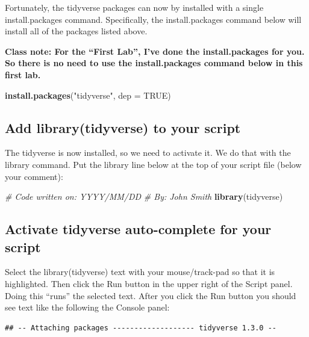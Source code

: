 \documentclass[
]{krantz}
\makeatletter
\newenvironment{Shaded}{\begin{snugshade}}{\end{snugshade}}
\newcommand{\CommentTok}[1]{\textcolor[rgb]{0.37,0.37,0.37}{\textit{#1}}}
\newcommand{\DataTypeTok}[1]{\textcolor[rgb]{0.27,0.27,0.27}{#1}}
\newcommand{\KeywordTok}[1]{\textcolor[rgb]{0.27,0.27,0.27}{\textbf{#1}}}
\newcommand{\NormalTok}[1]{#1}
\newcommand{\OtherTok}[1]{\textcolor[rgb]{0.37,0.37,0.37}{#1}}
\newcommand{\StringTok}[1]{\textcolor[rgb]{0.5,0.5,0.5}{#1}}
\newenvironment{kframe}{%
\medskip{}
\setlength{\fboxsep}{.8em}
 \def\at@end@of@kframe{}%
 \ifinner\ifhmode%
  \def\at@end@of@kframe{\end{minipage}}%
  \begin{minipage}{\columnwidth}%
 \fi\fi%
 \def\FrameCommand##1{\hskip\@totalleftmargin \hskip-\fboxsep
 \colorbox{shadecolor}{##1}\hskip-\fboxsep
     \hskip-\linewidth \hskip-\@totalleftmargin \hskip\columnwidth}%
 \MakeFramed {\advance\hsize-\width
   \@totalleftmargin\z@ \linewidth\hsize
   \@setminipage}}%
 {\par\unskip\endMakeFramed%
 \at@end@of@kframe}
\renewenvironment{Shaded}{\begin{kframe}}{\end{kframe}}
\makeatother
\begin{document}
Fortunately, the tidyverse packages can now by installed with a single install.packages command. Specifically, the install.packages command below will install all of the packages listed above.

\textbf{Class note: For the ``First Lab'', I've done the install.packages for you. So there is no need to use the install.packages command below in this first lab.}

\begin{Shaded}
\begin{Highlighting}[]
\KeywordTok{install.packages}\NormalTok{(}\StringTok{"tidyverse"}\NormalTok{, }\DataTypeTok{dep =} \OtherTok{TRUE}\NormalTok{)}
\end{Highlighting}
\end{Shaded}

\hypertarget{add-librarytidyverse-to-your-script}{%
\subsection{Add library(tidyverse) to your script}\label{add-librarytidyverse-to-your-script}}

The tidyverse is now installed, so we need to activate it. We do that with the library command. Put the library line below at the top of your script file (below your comment):

\begin{Shaded}
\begin{Highlighting}[]
\CommentTok{# Code written on: YYYY/MM/DD }
\CommentTok{# By: John Smith}
\KeywordTok{library}\NormalTok{(tidyverse)}
\end{Highlighting}
\end{Shaded}

\hypertarget{activate-tidyverse-auto-complete-for-your-script}{%
\subsection{Activate tidyverse auto-complete for your script}\label{activate-tidyverse-auto-complete-for-your-script}}

Select the library(tidyverse) text with your mouse/track-pad so that it is highlighted. Then click the Run button in the upper right of the Script panel. Doing this ``runs'' the selected text. After you click the Run button you should see text like the following the Console panel:

\begin{verbatim}
## -- Attaching packages ------------------- tidyverse 1.3.0 --
\end{verbatim}
\end{document}
